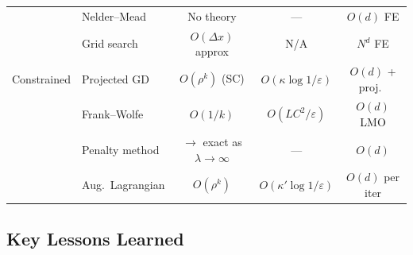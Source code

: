 \documentclass[11pt,a4paper]{article}
\theoremstyle{definition}
\begin{document}
\begin{table}[H]
\begin{tabular}{llccc}
 & Nelder--Mead & No theory & --- & $O(d)$ FE \\
 & Grid search & $O(\Delta x)$ approx & N/A & $N^d$ FE \\
\midrule
Constrained & Projected GD & $O(\rho^k)$ (SC) & $O(\kappa\log 1/\varepsilon)$ & $O(d)$ + proj.\ \\
 & Frank--Wolfe & $O(1/k)$ & $O(LC^2/\varepsilon)$ & $O(d)$ LMO \\
 & Penalty method & $\to$ exact as $\lambda\to\infty$ & --- & $O(d)$ \\
 & Aug.\ Lagrangian & $O(\rho^k)$ & $O(\kappa'\log 1/\varepsilon)$ & $O(d)$ per iter \\
\bottomrule
\end{tabular}
\end{table}

\subsection{Key Lessons Learned}
\end{document}
